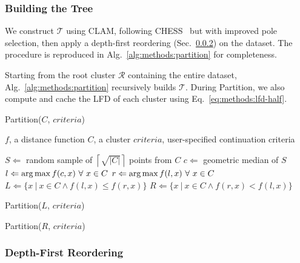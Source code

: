\subsubsection{Building the Tree}
\label{sec:methods:clustering:building-the-tree}

We construct $\mathcal{T}$ using CLAM, following CHESS~\cite{ishaq2019clustered} but with improved pole selection, then apply a depth-first reordering (Sec.~\ref{sec:methods:clustering:depth-first-reordering}) on the dataset.
The procedure is reproduced in Alg.~\ref{alg:methods:partition} for completeness.

Starting from the root cluster $\mathcal{R}$ containing the entire dataset, Alg.~\ref{alg:methods:partition} recursively builds $\mathcal{T}$.
During Partition, we also compute and cache the LFD of each cluster using Eq.~\ref{eq:methods:lfd-half}.

\begin{algorithm} %
    \caption{Partition($C$, $criteria$)} %
    \label{alg:methods:partition} %
    \begin{algorithmic} %
    \REQUIRE $f$, a distance function
    \REQUIRE $C$, a cluster
    \REQUIRE $criteria$, user-specified continuation criteria

    \STATE $S \Leftarrow$ random sample of $\left\lceil \sqrt{|C|} \right\rceil$ points from $C$
    \STATE $c \Leftarrow$ geometric median of $S$
    \STATE $l \Leftarrow \operatorname*{arg\,max} f(c, x) \ \forall \ x \in C$
    \STATE $r \Leftarrow \argmax f(l, x) \ \forall \ x \in C$
    \STATE $L \Leftarrow \{x \ | \ x \in C \land f(l, x) \le f(r, x)\}$
    \STATE $R \Leftarrow \{x \ | \ x \in C \land f(r, x) < f(l, x)\}$

        \STATE Partition($L$, $criteria$)
    \ENDIF

        \STATE Partition($R$, $criteria$)
    \ENDIF
\end{algorithmic}
\end{algorithm}


\subsubsection{Depth-First Reordering}
\label{sec:methods:clustering:depth-first-reordering}

